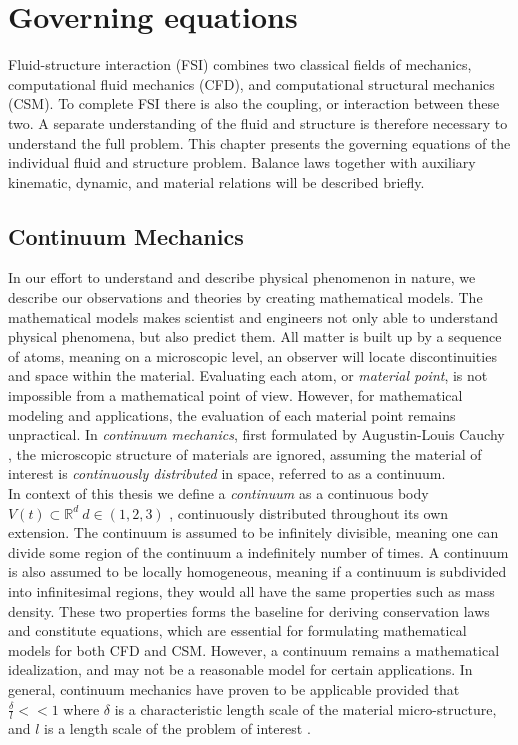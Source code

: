 \chapter{Governing equations}
Fluid-structure interaction (FSI) combines two classical fields of mechanics, computational fluid mechanics (CFD), and computational structural mechanics (CSM). To complete FSI there is also the coupling, or interaction between these two. A separate understanding of the fluid and structure is therefore necessary to understand the full problem. This chapter presents the governing equations of the individual fluid and structure problem. Balance laws together with auxiliary kinematic, dynamic, and material relations will be described briefly.
\section{Continuum Mechanics}
In our effort to understand and describe physical phenomenon in nature, we describe our observations and theories by creating mathematical models. The mathematical models makes scientist and engineers not only able to understand physical phenomena, but also predict them.  All matter is built up by a sequence of atoms, meaning on a microscopic level, an observer will locate discontinuities and space within the material. Evaluating each atom, or \textit{material point}, is not impossible from a mathematical point of view. However, for mathematical modeling and applications, the evaluation of each material point remains unpractical. In \textit{continuum mechanics}, first formulated by Augustin-Louis Cauchy \cite{Merodio2011}, the microscopic structure of materials are ignored,  assuming the material of interest is \textit{continuously distributed} in space, referred to as a continuum. \\
In context of this thesis we define a \textit{continuum} as a continuous body $V(t) \subset \mathbb{R}^d \ d \in (1, 2, 3)$ ,  continuously distributed throughout its own extension. The continuum is assumed to be infinitely divisible, meaning one can divide some region of the continuum a indefinitely number of times. A continuum is also assumed to be locally homogeneous, meaning if a continuum is subdivided into infinitesimal regions, they would all have the same properties such as mass density. These two properties forms the baseline for deriving conservation laws and constitute equations, which are essential for formulating mathematical models for both CFD and CSM. However, a continuum remains a mathematical idealization, and may not be a reasonable model for certain applications. In general, continuum mechanics have proven to be applicable provided that $\frac{\delta}{l} << 1$ where $\delta$ is a characteristic length scale of the material micro-structure, and $l$ is a length scale of the problem of interest \cite{Humphrey2002}.
